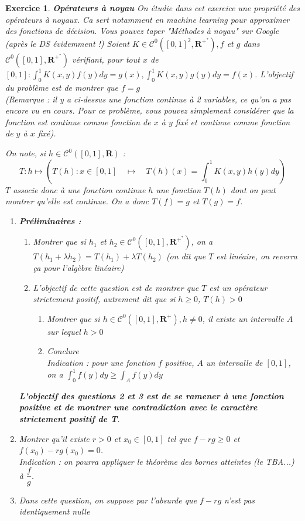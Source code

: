 \documentclass[a4paper,11pt]{article}
\newtheorem{exer}{Exercice} %
\begin{document}
\begin{exer}{\textbf{Opérateurs à noyau}}
\textit{On étudie dans cet exercice une propriété des opérateurs à noyaux. Ca sert notamment en machine learning pour approximer des fonctions de décision. Vous pouvez taper "Méthodes à noyau" sur Google (après le DS évidemment !)}
Soient $K \in \mathcal{C}^0\left([0,1]^2, \mathbf{R}^{+^*}\right), f$ et $g$ dans $\mathcal{C}^0\left([0,1], \mathbf{R}^{+^*}\right)$ vérifiant, pour tout $x$ de $[0,1]: \int_0^1 K(x, y) f(y) d y=g(x), \int_0^1 K(x, y) g(y) d y=f(x)$. 
L'objectif du problème est de montrer que $f = g$ \\
(\textit{Remarque} : il y a ci-dessus une fonction continue à 2 variables, ce qu'on a pas encore vu en cours. Pour ce problème, vous pouvez simplement considérer que la fonction est continue comme fonction de $x$ à $y$ fixé et continue comme fonction de $y$ à $x$ fixé).

On note, si $h \in \mathcal{C}^0([0,1], \mathbf{R})$ :
$$
T : h \mapsto \left(T(h) :x \in[0,1] \quad \mapsto \quad T(h)(x) =\int_0^1 K(x, y) h(y) d y \right)
$$
$T$ associe donc à une fonction continue $h$ une fonction $T(h)$ dont on peut montrer qu'elle est continue.
On a donc $T(f)=g$ et $T(g)=f$.
\begin{enumerate}
\item \textbf{Préliminaires :}
\begin{enumerate}
\item Montrer que si $h_1$ et $h_2 \in \mathcal{C}^0\left([0,1], \mathbf{R}^{+^*}\right)$, on a $T(h_1 + \lambda h_2) = T (h_1) + \lambda T(h_2)$ (on dit que $T$ est linéaire, on reverra ça pour l'algèbre linéaire) \newline
\item L'objectif de cette question est de montrer que $T$ est un opérateur strictement positif, autrement dit que si $h \geq 0$, $T(h) > 0$ 
\begin{enumerate}
\item Montrer que si $h \in \mathcal{C}^0\left([0,1], \mathbf{R}^{+}\right), h \neq 0$, il existe un intervalle $A$ sur lequel $h > 0$
\item Conclure \\
\textit{Indication :} pour une fonction $f$ positive, $A$ un intervalle de $[0,1]$, on a $\displaystyle\int_0^1 f(y) d y \geq \displaystyle\int_{A} f(y) d y$
\end{enumerate}

\end{enumerate}
\textbf{L'objectif des questions 2 et 3 est de se ramener à une fonction positive et de montrer une contradiction avec le caractère strictement positif de T}.
\item 
Montrer qu'il existe $r>0$ et $x_0 \in [0,1]$ tel que $f - rg \geq 0$ et $f(x_0) - r g(x_0) = 0$. \\
\textit{Indication :} on pourra appliquer le théorème des bornes atteintes (le TBA...) à $\dfrac{f}{g}$. \\
\item Dans cette question, on suppose par l'absurde que $f-r g$ n'est pas identiquement nulle
\begin{enumerate}


\end{enumerate}
\end{enumerate}
\end{exer}
\end{document}
